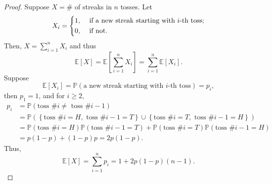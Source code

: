 \begin{proof}
    Suppose \(X = \#\) of streaks in \(n\) tosses. Let
    \[
        X_i = \begin{dcases}
            1, &\text{ if a new streak starting with } i\text{-th toss};\\
            0, &\text{ if not}.
        \end{dcases}
    \] 
    Then, \(X = \sum_{i=1}^n X_i \) and thus
    \[
        \mathbb{E} [X] = \mathbb{E} \left[ \sum_{i=1}^n X_i  \right] = \sum_{i=1}^n \mathbb{E} [X_i].  
    \] 
    Suppose
    \[
        \mathbb{E} [X_i] = \mathbb{P} (\text{a new streak starting with } i\text{-th toss}) = p_i,
    \]
    then \(p_1 = 1\), and for \(i \ge 2\), 
    \begin{align*}
        p_i &= \mathbb{P} (\text{toss \# } i \neq \text{ toss \# } i - 1) \\
            &= \mathbb{P} \left( \left\{ \text{toss \# } i = H, \text{ toss \#} i - 1 = T   \right\} \cup \left\{ \text{toss \# } i = T, \text{ toss \#} i - 1 = H   \right\}  \right) \\
            &= \mathbb{P} (\text{toss \# } i = H) \mathbb{P} (\text{toss \# } i - 1 = T) + \mathbb{P} (\text{toss \# } i = T) \mathbb{P} (\text{toss \# } i - 1 = H) \\
            &= p(1 - p) + (1 - p)p = 2p(1 - p). 
    \end{align*}  
    Thus, 
    \[
        \mathbb{E} [X] = \sum_{i=1}^n p_i = 1 + 2p(1 - p)(n - 1). 
    \]
\end{proof}